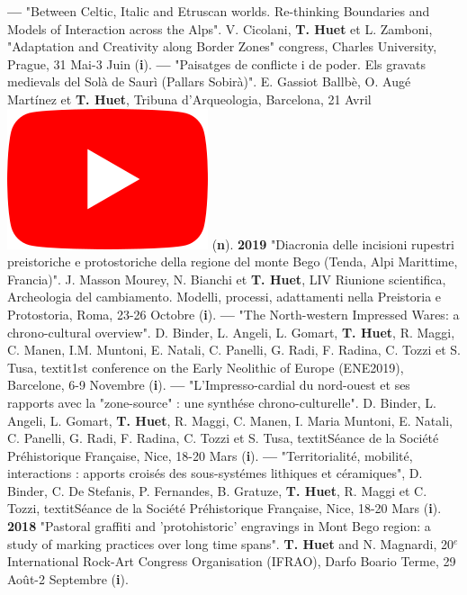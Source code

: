 \documentclass{article}
\begin{document}
{\smallbreak
\textbf{--- }"Between Celtic, Italic and Etruscan worlds. Re-thinking Boundaries and Models of Interaction across the Alps". V. Cicolani, \textbf{T. Huet} et L. Zamboni, "Adaptation and Creativity along Border Zones" congress, Charles University, Prague, 31 Mai-3 Juin (\textbf{i}).
\smallbreak
\textbf{--- }"Paisatges de conflicte i de poder. Els gravats medievals del Sol\`{a} de Saur\`{i} (Pallars Sobir\`{a})". E. Gassiot Ballb\`{e}, O. Aug\'{e} Mart\'{i}nez et \textbf{T. Huet}, Tribuna d'Arqueologia, Barcelona, 21 Avril \href{https://www.youtube.com/watch?v=4b7gLw4NV_E}{\includegraphics[scale=0.2]{icon_youtube}} (\textbf{n}).
\smallbreak
\textbf{2019 }"Diacronia delle incisioni rupestri preistoriche e protostoriche della regione del monte Bego (Tenda, Alpi Marittime, Francia)". J. Masson Mourey, N. Bianchi et \textbf{T. Huet}, LIV Riunione scientifica, Archeologia del cambiamento. Modelli, processi, adattamenti nella Preistoria e Protostoria, Roma, 23-26 Octobre (\textbf{i}).
\smallbreak
\textbf{--- }"The North-western Impressed Wares: a chrono-cultural overview". D. Binder, L. Angeli, L. Gomart, \textbf{T. Huet}, R. Maggi, C. Manen, I.M. Muntoni, E. Natali, C. Panelli, G. Radi, F. Radina, C. Tozzi et S. Tusa, textit{1st conference on the Early Neolithic of Europe (ENE2019)}, Barcelone, 6-9 Novembre (\textbf{i}).
\smallbreak
\textbf{--- }"L'Impresso-cardial du nord-ouest et ses rapports avec la "zone-source" : une synth\'{e}se chrono-culturelle". D. Binder, L. Angeli, L. Gomart, \textbf{T. Huet}, R. Maggi, C. Manen, I. Maria Muntoni, E. Natali, C. Panelli, G. Radi, F. Radina, C. Tozzi et S. Tusa, textit{S\'{e}ance de la Soci\'{e}t\'{e} Pr\'{e}historique Fran\c{c}aise}, Nice, 18-20 Mars (\textbf{i}).
\smallbreak
\textbf{--- }"Territorialit\'{e}, mobilit\'{e}, interactions : apports crois\'{e}s des sous-syst\'{e}mes lithiques et c\'{e}ramiques", D. Binder, C. De Stefanis, P. Fernandes, B. Gratuze, \textbf{T. Huet}, R. Maggi et C. Tozzi, textit{S\'{e}ance de la Soci\'{e}t\'{e} Pr\'{e}historique Fran\c{c}aise}, Nice, 18-20 Mars (\textbf{i}).
\smallbreak
\textbf{2018 }"Pastoral graffiti and 'protohistoric' engravings in Mont Bego region: a study of marking practices over long time spans". \textbf{T. Huet} and N. Magnardi, 20${}^{e}$ International Rock-Art Congress Organisation (IFRAO), Darfo Boario Terme, 29 Août-2 Septembre (\textbf{i}).
}
\end{document}
